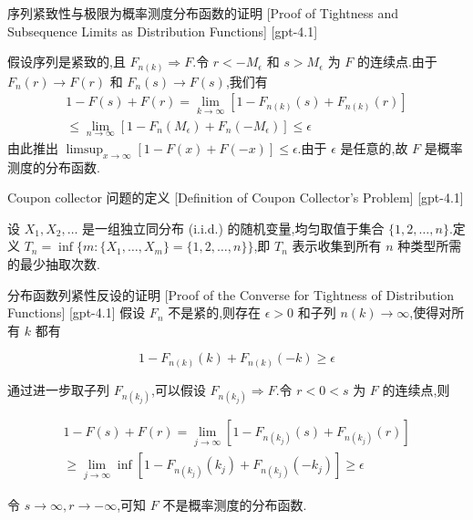 \documentclass[UTF8]{ctexart}
\begin{document}
    
    
    \begin{prf}
        {序列紧致性与极限为概率测度分布函数的证明}
        [Proof of Tightness and Subsequence Limits as Distribution Functions]
        [gpt-4.1]
        
假设序列是紧致的,且 $F_{n(k)} \Rightarrow F$.令 $r < -M_\epsilon$ 和 $s > M_\epsilon$ 为 $F$ 的连续点.由于 $F_n(r) \to F(r)$ 和 $F_n(s) \to F(s)$,我们有
\[
\begin{array}{c}
1 - F(s) + F(r) = \displaystyle \lim_{k \to \infty} \left[1 - F_{n(k)}(s) + F_{n(k)}(r)\right] \\
\leq \displaystyle \lim_{n \to \infty} \left[1 - F_n(M_\epsilon) + F_n(-M_\epsilon)\right] \leq \epsilon
\end{array}
\]
由此推出 $\limsup_{x \to \infty} \left[1 - F(x) + F(-x)\right] \leq \epsilon$.由于 $\epsilon$ 是任意的,故 $F$ 是概率测度的分布函数.

    \end{prf}
    
    
    
    \begin{dfn}
        {Coupon collector 问题的定义}
        [Definition of Coupon Collector's Problem]
        [gpt-4.1]
        
设 $X_1, X_2, \ldots$ 是一组独立同分布 (i.i.d.) 的随机变量,均匀取值于集合 $\{1, 2, \ldots, n\}$.定义 $T_n = \inf \{ m : \{ X_1, \ldots, X_m \} = \{ 1, 2, \ldots, n \} \}$,即 $T_n$ 表示收集到所有 $n$ 种类型所需的最少抽取次数.

    \end{dfn}
    
    
    
    \begin{prf}
        {分布函数列紧性反设的证明}
        [Proof of the Converse for Tightness of Distribution Functions]
        [gpt-4.1]
        假设 $F_n$ 不是紧的,则存在 $\epsilon > 0$ 和子列 $n(k)\to\infty$,使得对所有 $k$ 都有

\[
1 - F_{n(k)}(k) + F_{n(k)}(-k) \geq \epsilon
\]

通过进一步取子列 $F_{n(k_j)}$,可以假设 $F_{n(k_j)} \Rightarrow F$.令 $r<0<s$ 为 $F$ 的连续点,则

\[
\begin{array}{l}
1 - F(s) + F(r) = \displaystyle \lim_{j \to \infty} \left[1 - F_{n(k_{j})}(s) + F_{n(k_{j})}(r)\right] \\
\geq \displaystyle \lim_{j \to \infty} \inf \left[1 - F_{n(k_{j})}(k_{j}) + F_{n(k_{j})}(-k_{j})\right] \geq \epsilon
\end{array}
\]

令 $s\to\infty, r\to-\infty$,可知 $F$ 不是概率测度的分布函数.

    \end{prf}
    
\end{document}
